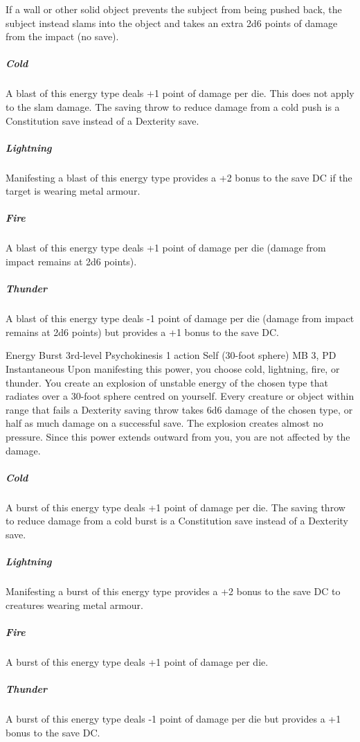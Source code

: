 If a wall or other solid object prevents the subject from being pushed back,
the subject instead slams into the object and takes an extra
2d6 points of damage from the impact (no save).
\subparagraph{Cold}
  A blast of this energy type deals +1 point of damage per die.
  This does not apply to the slam damage.
  The saving throw to reduce damage from a cold push
  is a Constitution save instead of a Dexterity save.
\subparagraph{Lightning}
  Manifesting a blast of this energy type provides a +2 bonus
  to the save DC if the target is wearing metal armour.
\subparagraph{Fire}
  A blast of this energy type deals +1 point of damage per die
  (damage from impact remains at 2d6 points).
\subparagraph{Thunder}
  A blast of this energy type deals -1 point of damage per die
  (damage from impact remains at 2d6 points)
  but provides a +1 bonus to the save DC.

\DndPowerHeader%
  {Energy Burst}
  {3rd-level Psychokinesis}
  {1 action}
  {Self (30-foot sphere)}
  {MB 3, PD \lvlthree}
  {Instantaneous}
Upon manifesting this power, you choose cold, lightning,
fire, or thunder.
You create an explosion of unstable energy of the chosen type
that radiates over a 30-foot sphere
centred on yourself.
Every creature or object within range that fails a Dexterity saving throw
takes 6d6 damage of the chosen type,
or half as much damage on a successful save.
The explosion creates almost no pressure.
Since this power extends outward from you,
you are not affected by the damage.

\subparagraph{Cold}
A burst of this energy type deals +1 point of damage per die.
The saving throw to reduce damage from a cold burst
is a Constitution save instead of a Dexterity save.

\subparagraph{Lightning}
Manifesting a burst of this energy type provides a +2 bonus
to the save DC to creatures wearing metal armour.

\subparagraph{Fire}
A burst of this energy type deals +1 point of damage per die.

\subparagraph{Thunder}
A burst of this energy type deals -1 point of damage per die
but provides a +1 bonus to the save DC.

